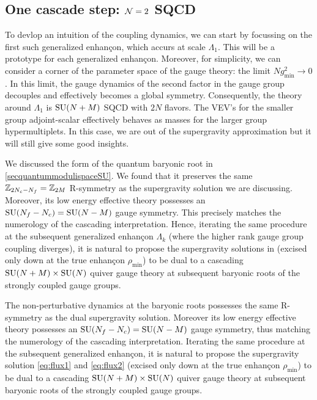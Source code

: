     

    \subsection{One cascade step: $\mathcal{N}=2$ SQCD}

        To devlop an intuition of the coupling dynamics, we can start by focussing on the first such generalized enhançon, which accurs at scale $\Lambda_1$. This will be a prototype for each generalized enhançon. Moreover, for simplicity, we can consider a corner of the parameter space of the gauge theory: the limit $Ng^2_{\text{min}}\to0$. In this limit, the gauge dynamics of the second factor in the gauge group decouples and effectively becomes a global symmetry. Consequently, the theory around $\Lambda_1$ is $\text{SU}(N+M)$ SQCD with $2N$ flavors. The VEV's for the smaller group adjoint-scalar effectively behaves as masses for the larger group hypermultiplets. In this case, we are out of the supergravity approximation but it will still give some good insights.

        We discussed the form of the quantum baryonic root in \ref{secquantummodulispaceSU}. We found that it preserves the same $\mathbb{Z}_{2N_c-N_f}=\mathbb{Z}_{2M}$ R-symmetry as the supergravity solution we are discussing. Moreover, its low energy effective theory possesses an $\text{SU}(N_f-N_c)=\text{SU}(N-M)$ gauge symmetry. This precisely matches the numerology of the cascading interpretation. Hence, iterating the same procedure at the subsequent generalized enhançon $\Lambda_k$ (where the higher rank gauge group coupling diverges), it is natural to propose the supergravity solutions in  (excised only down at the true enhançon $\rho_{\text{min}}$) to be dual to a cascading $\text{SU}(N+M)\times\text{SU}(N)$ quiver gauge theory at subsequent baryonic roots of the strongly coupled gauge groups.

        \begin{mybox}
            The non-perturbative dynamics at the baryonic roots possesses the same R-symmetry as the dual supergravity solution. Moreover its low energy effective theory possesses an $\text{SU}(N_f-N_c)=\text{SU}(N-M)$ gauge symmetry, thus matching the numerology of the cascading interpretation. Iterating the same procedure at the subsequent generalized enhançon, it is natural to propose the supergravity solution \eqref{eq:flux1} and \eqref{eq:flux2} (excised only down at the true enhançon $\rho_{\text{min}}$) to be dual to a cascading $\text{SU}(N+M)\times\text{SU}(N)$ quiver gauge theory at subsequent baryonic roots of the strongly coupled gauge groups.
        \end{mybox}

